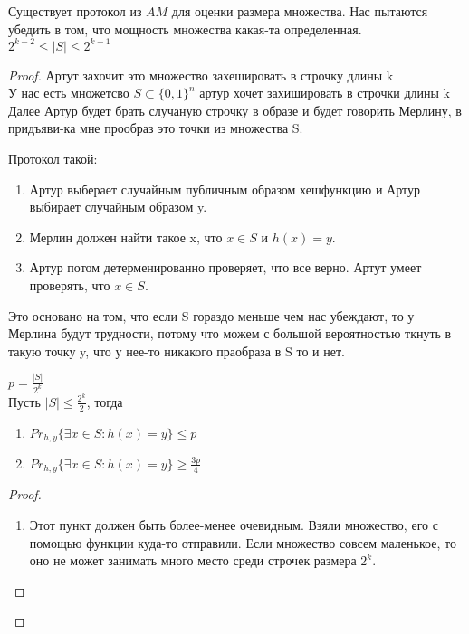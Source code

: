 \begin{theorem}
	Существует протокол из $AM$ для оценки размера множества. 
	Нас пытаются убедить в том, что мощность множества какая-та определенная. $2^{k - 2} \le |S| \le 2^{k - 1}$\\
\end{theorem}
\begin{proof}
	Артут захочит это множество захешировать в строчку длины k\\
	У нас есть множетсво $S \subset \{0, 1\}^{n}$ артур хочет захишировать в строчки длины k\\
	
	Далее Артур будет брать случаную строчку в образе и будет говорить Мерлину, в придъяви-ка мне прообраз 
	это точки из множества S.

       	Протокол такой:
       	\begin{enumerate}
       	\item Артур выберает случайным публичным образом хешфункцию и Артур выбирает случайным образом y.  
       	\item Мерлин должен найти такое x, что $x \in S$ и $h(x) = y$.
       	\item Артур потом детерменированно проверяет, что все верно. Артут умеет проверять, что $x \in S$. 
       	\end{enumerate}

	Это основано на том, что если S гораздо меньше чем нас убеждают, то у Мерлина будут трудности, потому что
	можем с большой вероятностью ткнуть в такую точку y, что у нее-то никакого праобраза в S то и нет.   

	\begin{lemma}
		$p = \frac{|S|}{2^k}$\\
		Пусть $|S| \le \frac{2^k}{2}$, тогда		 
		\begin{enumerate}
		\item                    	
			$Pr_{h,y}\{\exists x \in S \colon h(x) = y\} \le p$\\
		\item
			$Pr_{h,y}\{\exists x \in S \colon h(x) = y\} \ge \frac{3p}{4}$
	\end{enumerate}
	\end{lemma}
	\begin{proof}
		\begin{enumerate}
		\item Этот пункт должен быть более-менее очевидным.
		Взяли множество, его с помощью функции куда-то отправили. Если множество
		совсем маленькое, то оно не может занимать много место среди строчек размера $2^k$.


\end{enumerate}
\end{proof}
\end{proof}
